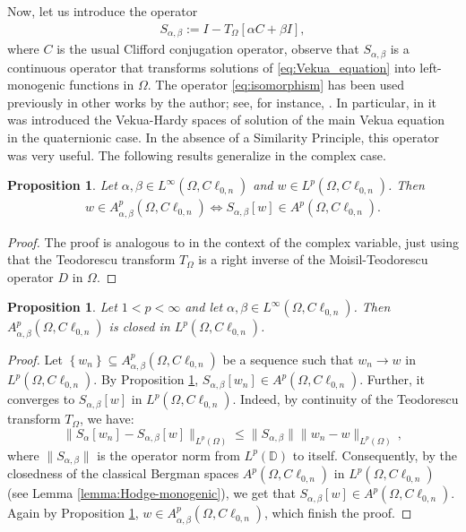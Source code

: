\documentclass[12pt]{article}
\newcommand{\comment}[1]{\marginpar{\hfuzz=5ex
\scriptsize$\stackrel{?}{\longleftarrow}$\\\hspace*{-3ex}
{\fbox{\parbox{20ex}{\hfuzz=15ex \raggedright\sf#1 }}} }}
\newtheorem{proposition}[theorem]{Proposition}
\def\D{\mathbb{D}}
\newcommand{\JLm}[1]{\textcolor{magenta}{#1}}
\begin{document}
Now, let us introduce the operator 
\begin{align}\label{eq:isomorphism}
S_{\alpha,\beta}:=I-T_{\Omega}[\alpha C+\beta I],
\end{align}
where $C$ is the usual Clifford conjugation operator, observe that  $S_{\alpha,\beta}$ is a continuous operator that transforms solutions of \eqref{eq:Vekua_equation} into left-monogenic functions in $\Omega$. 
The operator \eqref{eq:isomorphism} has been used previously in other works by the author; see, for instance, \cite{DelLeb2020, DelPor2019}. In particular, in \cite{DelPor2019} it was introduced the Vekua-Hardy spaces of solution of the main Vekua equation in the quaternionic case. In the absence of a Similarity Principle, this operator was very useful. 
The following results generalize \cite[Sec.\ 3]{DelLeb2020} in the complex case.
\begin{proposition}\label{lemma:transformationS}
Let $\alpha, \beta \in L^{\infty}(\Omega,C\ell_{0,n})$ and $w\in L^p(\Omega,C\ell_{0,n})$. Then
\begin{align*}
w\in A_{\alpha,\beta}^p(\Omega,C\ell_{0,n}) \Leftrightarrow S_{\alpha,\beta}[w] \in A^p(\Omega,C\ell_{0,n}). 
\end{align*}
\end{proposition}
\begin{proof}
The proof is analogous to \cite[Lem.\ 3.1]{DelLeb2020} in the context of the complex variable, just using that the Teodorescu transform $T_{\Omega}$ is a right inverse of the Moisil-Teodorescu operator $D$ in $\Omega$.
\end{proof}
\begin{proposition}\label{prop:Bergman-generalized-closed}
Let $1< p<\infty$ and let $\alpha, \beta\in L^{\infty}(\Omega,C\ell_{0,n})$. Then $A_{\alpha,\beta}^p(\Omega,C\ell_{0,n})$ is closed in $L^p(\Omega,C\ell_{0,n})$.
\end{proposition}
\begin{proof}
  Let $\left\{w_n\right\}\subseteq A_{\alpha,\beta}^p(\Omega,C\ell_{0,n})$ be a sequence such that $w_n\rightarrow w$ in $L^p(\Omega,C\ell_{0,n})$. By Proposition \ref{lemma:transformationS}, $S_{\alpha,\beta}[w_n]\in A^p(\Omega,C\ell_{0,n})$. Further, it converges to $S_{\alpha,\beta}[w]$ in $L^p(\Omega,C\ell_{0,n})$.
Indeed, by  continuity of the Teodorescu transform $T_{\Omega}$,
    we have:
\[ %
\|S_{\alpha}[w_n]-S_{\alpha,\beta}[w]\|_{L^p(\Omega)} \leq \|S_{\alpha,\beta}\| \|w_n-w\|_{L^p(\Omega)} \, ,
\] %
where $\|S_{\alpha,\beta}\|$ is the operator norm from $L^p(\D)$ to itself.
Consequently, by the closedness of the classical Bergman spaces $A^p(\Omega, C\ell_{0,n})$ in $L^p(\Omega,C\ell_{0,n})$ (see Lemma \ref{lemma:Hodge-monogenic}), we get that $S_{\alpha,\beta}[w]\in A^p(\Omega,C\ell_{0,n})$. Again by Proposition \ref{lemma:transformationS}, $w\in A_{\alpha,\beta}^p(\Omega,C\ell_{0,n})$, which finish the proof.
\end{proof}
\end{document}
